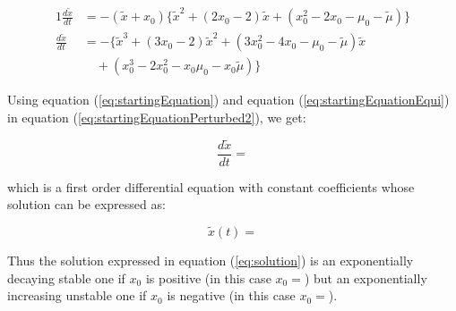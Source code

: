 \documentclass{article}
\begin{document}
	\begin{alignat}{1}
		\label{eq:startingEquationPerturbed3}
		\frac{d\tilde{x}}{dt} &= -(\tilde{x}+x_0)\{\tilde{x}^2 + (2x_0-2)\tilde{x} + (x_0^2-2x_0-\mu_0-\tilde{\mu})\} \nonumber \\		
		\frac{d\tilde{x}}{dt} &= -\{\tilde{x}^3 + (3x_0-2)\tilde{x}^2 + (3x_0^2-4x_0-\mu_0-\tilde{\mu})\tilde{x} \\&{\hspace{12pt}}   +(x_0^3 -2x_0^2 -x_0\mu_0 -x_0\tilde{\mu})\} \nonumber
	\end{alignat}	
	
	Using equation (\ref{eq:startingEquation}) and equation (\ref{eq:startingEquationEqui}) in equation (\ref{eq:startingEquationPerturbed2}), we get:
	
	\begin{equation}
		\frac{d\tilde x}{dt} = 
	\end{equation}
	
	which is a first order differential equation with constant coefficients whose solution can be expressed as:
	
	\begin{equation}
		\label{eq:solution}
		\tilde{x}(t) = 
	\end{equation}
	
	Thus the solution expressed in equation (\ref{eq:solution}) is an exponentially decaying stable one if $x_0$ is positive (in this case $x_0 = $) but an exponentially increasing unstable one if $x_0$ is negative (in this case $x_0 = $).
\end{document}
